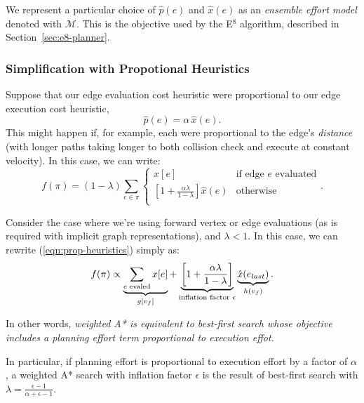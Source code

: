 We represent a particular choice of $\hat{p}(e)$
and $\hat{x}(e)$ as an \emph{ensemble effort model}
denoted with $\mathcal{M}$.
This is the objective used by the E$^8$ algorithm,
described in Section~\ref{sec:e8-planner}.

\subsubsection*{Simplification with Propotional Heuristics}

Suppose that our edge evaluation cost heuristic
were proportional to our edge execution cost heuristic,
\begin{equation}
   \hat{p}(e) = \alpha \, \hat{x}(e) .
\end{equation}
This might happen if, for example, each were proportional to the edge's
\emph{distance} (with longer paths taking longer to both collision check
and execute at constant velocity).
In this case, we can write:
\begin{equation}
   f(\pi) = (1-\lambda) \sum_{e \in \pi} \left\{
   \begin{array}{cl}
      x[e] & \mbox{if edge } e \mbox{ evaluated}  \\
      \left[ 1 + \frac{\alpha\lambda}{1 - \lambda} \right] \hat{x}(e) & \mbox{otherwise} \\
   \end{array}
   \right.
   .
   \label{eqn:prop-heuristics}
\end{equation}

Consider the case where we're using forward vertex or edge evaluations
(as is required with implicit graph representations),
and $\lambda < 1$.
In this case, we can rewrite (\ref{eqn:prop-heuristics})
simply as:
\begin{equation}
   f(\pi) \propto
   \underbrace{\sum_{e \; \mbox{\scriptsize evaled}} x[e]}_{g[v_f]}
   +
   \underbrace{\left[ 1 + \frac{\alpha \lambda}{1-\lambda} \right]}_{
      \mbox{\scriptsize inflation factor } \epsilon}
   \underbrace{\hat{x}(e_{last})}_{h(v_f)}
   .
\end{equation}

In other words,
\emph{weighted A* is equivalent to
   best-first search whose objective
   includes a planning effort term
   proportional to execution effot.}

In particular, if planning effort is proportional to execution
effort by a factor of $\alpha$,
a weighted A* search with inflation factor $\epsilon$
is the result of best-first search with
$\lambda = \frac{\epsilon-1}{\alpha+\epsilon-1}$.

